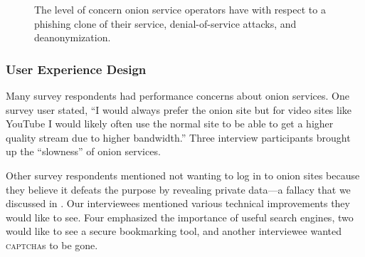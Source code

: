 \begin{figure}[t]
    \centering
    
    \caption{The level of concern onion service operators have with respect to a
    phishing clone of their service, denial-of-service attacks, and
    deanonymization.}
    \label{fig:onion-operation-concerns}
\end{figure}



\subsubsection{User Experience Design}

Many survey respondents had performance concerns about onion services.   One survey user stated, ``I would always prefer the onion site
but for video sites like YouTube I would likely often use the normal site to be
able to get a higher quality stream due to higher bandwidth.''  Three interview
participants brought up the ``slowness'' of onion services.

Other survey respondents mentioned not wanting to log in to onion sites because
they believe it defeats the purpose by revealing private data---a fallacy that
we discussed in .  Our interviewees mentioned various
technical improvements they would like to see.  Four emphasized the importance
of useful search engines, two would like to see a secure bookmarking tool, and
another interviewee wanted \textsc{captcha}s to be gone.

